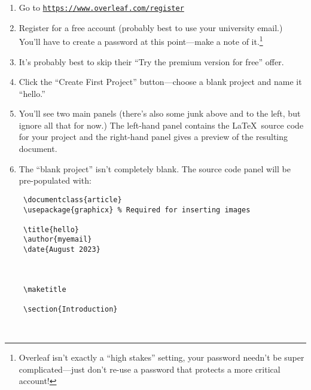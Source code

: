 \begin{enumerate}
	\item Go to \href{https://www.overleaf.com/register}{\tt https://www.overleaf.com/register}
	\item Register for a free account (probably best to use your university email.)  You'll have to create a password at this point---make a note of it.\footnote{Overleaf isn't exactly a ``high stakes'' setting, your password needn't be super complicated---just don't re-use a password that protects a more critical account!}
	\item It's probably best to skip their ``Try the premium version for free'' offer.
    \item Click the ``Create First Project'' button---choose a blank project and name it ``hello.''
    \item You'll see two main panels (there's also some junk above and to the left, but ignore all that for now.)  The left-hand panel contains the \LaTeX\ source code for your project and the right-hand panel gives a preview of the resulting document.
    \item The ``blank project'' isn't completely blank.  The source code panel will be pre-populated with:
\medskip

\begin{codeblock}
\begin{verbatim}
 \documentclass{article}
 \usepackage{graphicx} % Required for inserting images

 \title{hello}
 \author{myemail}
 \date{August 2023}

 

 \maketitle

 \section{Introduction}

 
\end{verbatim}
\end{codeblock}

\clearpage


\end{enumerate}
